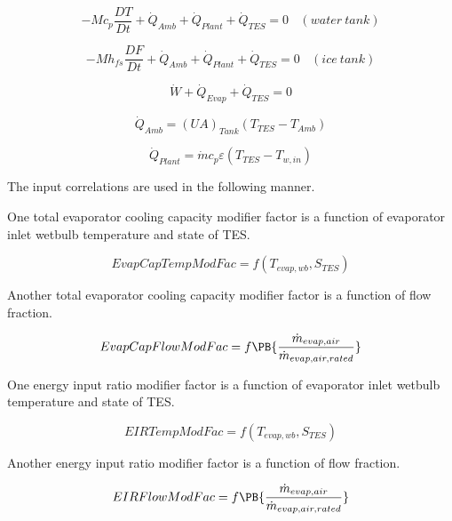 \begin{equation}
-M{c_p}\frac{{DT}}{{Dt}} + {\dot Q_{Amb}} + {\dot Q_{Plant}} + {\dot Q_{TES}} = 0 ~~~~ (water~tank)
\end{equation}

\begin{equation}
-M{h_{fs}}\frac{{DF}}{{Dt}} + {\dot Q_{Amb}} + {\dot Q_{Plant}} + {\dot Q_{TES}} = 0 ~~~~ (ice~tank)
\end{equation}

\begin{equation}
\dot W + {\dot Q_{Evap}} + {\dot Q_{TES}} = 0
\end{equation}

\begin{equation}
{\dot Q_{Amb}} = {\left( {UA} \right)_{Tank}}\left( {{T_{TES}} - {T_{Amb}}} \right)
\end{equation}

\begin{equation}
{\dot Q_{Plant}} = \dot m{c_p}\varepsilon \left( {{T_{TES}} - {T_{w,in}}} \right)
\end{equation}

The input correlations are used in the following manner.

One total evaporator cooling capacity modifier factor is a function of evaporator inlet wetbulb temperature and state of TES.

\begin{equation}
EvapCapTempModFac = f\left( {{T_{evap,wb}},{S_{TES}}} \right)
\end{equation}

Another total evaporator cooling capacity modifier factor is a function of flow fraction.

\begin{equation}
EvapCapFlowModFac = f\PB{\frac{\dot{m}_{evap,air}}{\dot{m}_{evap,air,rated}}}
\end{equation}

One energy input ratio modifier factor is a function of evaporator inlet wetbulb temperature and state of TES.

\begin{equation}
EIRTempModFac = f\left( {{T_{evap,wb}},{S_{TES}}} \right)
\end{equation}

Another energy input ratio modifier factor is a function of flow fraction.

\begin{equation}
EIRFlowModFac = f\PB{\frac{\dot{m}_{evap,air}}{\dot{m}_{evap,air,rated}}}
\end{equation}

